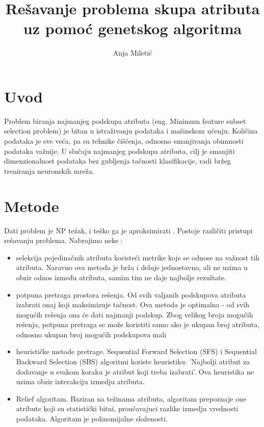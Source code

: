 \documentclass[11pt]{article} %
\title{Rešavanje problema skupa atributa uz pomoć genetskog algoritma}
\author{Anja Miletić}
\begin{document}
\maketitle
\newpage

\doublespacing
\tableofcontents
\singlespacing
\newpage


\section{Uvod}
Problem biranja najmanjeg podskupa atributa (eng. Minimum feature subset selection problem) je bitan u istraživanju podataka i mašinskom učenju. Količina podataka je sve veća, pa su tehnike čišćenja, odnosno smanjivanja obimnosti podataka važnije. U slučaju najmanjeg podskupa atributa, cilj je smanjiti dimenzionalnost podataka bez gubljenja tačnosti klasifikacije, radi bržeg treniranja neuronskih mreža. 

\section{Metode}
Dati problem je NP težak, i teško ga je aproksimirati \cite{VanHorn}. Postoje različiti pristupi rešavanju problema. Nabrojimo neke \cite{Kira}:
\begin{itemize}
\item selekcija pojedinačnih atributa koristeći metrike koje se odnose na važnost tih atributa. Naravno ova metoda je brža i deluje jednostavno, ali ne uzima u obzir odnos između atributa, samim tim ne daje najbolje rezultate.
\item potpuna pretraga prostora rešenja. Od svih valjanih podskupova atributa izabrati onaj koji maksimizuje tačnost. Ova metoda je optimalna - od svih mogućih rešenja ona će dati najmanji podskup.  Zbog velikog broja mogućih rešenja, potpuna pretraga se može koristiti samo ako je ukupan broj atributa, odnosno ukupan broj mogućih podskupova mali
\item heurističke metode pretrage. Sequential Forward Selection (SFS) i Sequential Backward Selection (SBS) algoritmi koriste heuristiku: 'Najbolji atribut za dodavanje u svakom koraku je atribut koji treba izabrati'. Ova heuristika ne uzima obzir interakciju izmedju atributa.
\item Relief algoritam. Baziran na težinama atributa, algoritam prepoznaje one atribute koji su statistički bitni, proučavajuci razlike izmedju vrednosti podataka. Algoritam je polinomijalne složenosti.
\end{itemize} 
\end{document}
